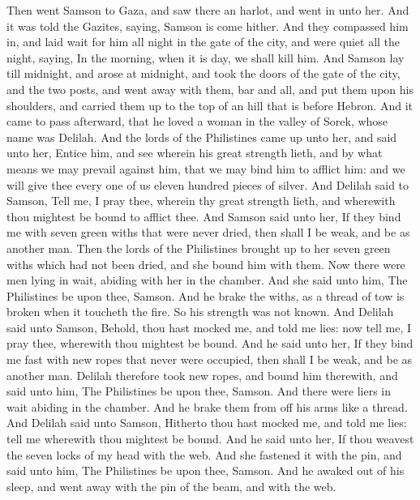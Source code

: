 \begin{biblechapter} %
 Then went Samson to Gaza, and saw there an harlot, and went in unto her.
\verse And it was told the Gazites, saying, Samson is come hither. And they compassed him in, and laid wait for him all night in the gate of the city, and were quiet all the night, saying, In the morning, when it is day, we shall kill him.
\verse And Samson lay till midnight, and arose at midnight, and took the doors of the gate of the city, and the two posts, and went away with them, bar and all, and put them upon his shoulders, and carried them up to the top of an hill that is before Hebron.
\verse And it came to pass afterward, that he loved a woman in the valley of Sorek, whose name was Delilah.
\verse And the lords of the Philistines came up unto her, and said unto her, Entice him, and see wherein his great strength lieth, and by what means we may prevail against him, that we may bind him to afflict him: and we will give thee every one of us eleven hundred pieces of silver.
\verse And Delilah said to Samson, Tell me, I pray thee, wherein thy great strength lieth, and wherewith thou mightest be bound to afflict thee.
\verse And Samson said unto her, If they bind me with seven green withs that were never dried, then shall I be weak, and be as another man.
\verse Then the lords of the Philistines brought up to her seven green withs which had not been dried, and she bound him with them.
\verse Now there were men lying in wait, abiding with her in the chamber. And she said unto him, The Philistines be upon thee, Samson. And he brake the withs, as a thread of tow is broken when it toucheth the fire. So his strength was not known.
\verse And Delilah said unto Samson, Behold, thou hast mocked me, and told me lies: now tell me, I pray thee, wherewith thou mightest be bound.
\verse And he said unto her, If they bind me fast with new ropes that never were occupied, then shall I be weak, and be as another man.
\verse Delilah therefore took new ropes, and bound him therewith, and said unto him, The Philistines be upon thee, Samson. And there were liers in wait abiding in the chamber. And he brake them from off his arms like a thread.
\verse And Delilah said unto Samson, Hitherto thou hast mocked me, and told me lies: tell me wherewith thou mightest be bound. And he said unto her, If thou weavest the seven locks of my head with the web.
\verse And she fastened it with the pin, and said unto him, The Philistines be upon thee, Samson. And he awaked out of his sleep, and went away with the pin of the beam, and with the web.

\end{biblechapter}
